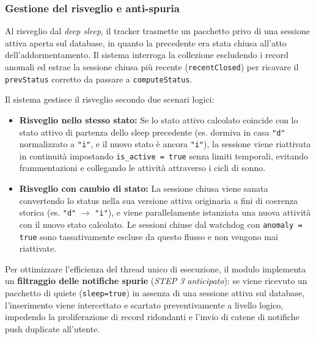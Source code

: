 \documentclass[12pt,a4paper]{article}
\begin{document}
\subsubsection{Gestione del risveglio e anti-spuria}
Al risveglio dal \textit{deep sleep}, il tracker trasmette un pacchetto privo di una sessione attiva aperta sul database, in quanto la precedente era stata chiusa all'atto dell'addormentamento. Il sistema interroga la collezione escludendo i record anomali ed estrae la sessione chiusa più recente (\texttt{recentClosed}) per ricavare il \texttt{prevStatus} corretto da passare a \texttt{computeStatus}.

Il sistema gestisce il risveglio secondo due scenari logici:
\begin{itemize}
    \item \textbf{Risveglio nello stesso stato:} Se lo stato attivo calcolato coincide con lo stato attivo di partenza dello sleep precedente (es. dormiva in casa \texttt{"d"} normalizzato a \texttt{"i"}, e il nuovo stato è ancora \texttt{"i"}), la sessione viene riattivata in continuità impostando \texttt{is\_active = true} senza limiti temporali, evitando frammentazioni e collegando le attività attraverso i cicli di sonno.
    \item \textbf{Risveglio con cambio di stato:} La sessione chiusa viene sanata convertendo lo status nella sua versione attiva originaria a fini di coerenza storica (es. \texttt{"d"} $\to$ \texttt{"i"}), e viene parallelamente istanziata una nuova attività con il nuovo stato calcolato. Le sessioni chiuse dal watchdog con \texttt{anomaly = true} sono tassativamente escluse da questo flusso e non vengono mai riattivate.
\end{itemize}
Per ottimizzare l'efficienza del thread unico di esecuzione, il modulo implementa un \textbf{filtraggio delle notifiche spurie} (\textit{STEP 3 anticipato}): se viene ricevuto un pacchetto di quiete (\texttt{sleep=true}) in assenza di una sessione attiva sul database, l'inserimento viene intercettato e scartato preventivamente a livello logico, impedendo la proliferazione di record ridondanti e l'invio di catene di notifiche push duplicate all'utente.
\end{document}

